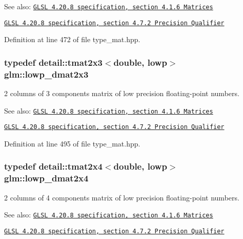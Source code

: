 \begin{Desc}
\item[See also:]\href{http://www.opengl.org/registry/doc/GLSLangSpec.4.20.8.pdf}{\tt GLSL 4.20.8 specification, section 4.1.6 Matrices} 

\href{http://www.opengl.org/registry/doc/GLSLangSpec.4.20.8.pdf}{\tt GLSL 4.20.8 specification, section 4.7.2 Precision Qualifier} \end{Desc}


Definition at line 472 of file type\_\-mat.hpp.\hypertarget{group__core__precision_g2c7432984a35cf72050870a54485ef35}{
\subsubsection[lowp\_\-dmat2x3]{\setlength{\rightskip}{0pt plus 5cm}typedef detail::tmat2x3$<$double, lowp$>$ {\bf glm::lowp\_\-dmat2x3}}}
\label{group__core__precision_g2c7432984a35cf72050870a54485ef35}


2 columns of 3 components matrix of low precision floating-point numbers.

\begin{Desc}
\item[See also:]\href{http://www.opengl.org/registry/doc/GLSLangSpec.4.20.8.pdf}{\tt GLSL 4.20.8 specification, section 4.1.6 Matrices} 

\href{http://www.opengl.org/registry/doc/GLSLangSpec.4.20.8.pdf}{\tt GLSL 4.20.8 specification, section 4.7.2 Precision Qualifier} \end{Desc}


Definition at line 495 of file type\_\-mat.hpp.\hypertarget{group__core__precision_gc2285cef559b0dc35cb9a7f22e6a2dd8}{
\subsubsection[lowp\_\-dmat2x4]{\setlength{\rightskip}{0pt plus 5cm}typedef detail::tmat2x4$<$double, lowp$>$ {\bf glm::lowp\_\-dmat2x4}}}
\label{group__core__precision_gc2285cef559b0dc35cb9a7f22e6a2dd8}


2 columns of 4 components matrix of low precision floating-point numbers.

\begin{Desc}
\item[See also:]\href{http://www.opengl.org/registry/doc/GLSLangSpec.4.20.8.pdf}{\tt GLSL 4.20.8 specification, section 4.1.6 Matrices} 

\href{http://www.opengl.org/registry/doc/GLSLangSpec.4.20.8.pdf}{\tt GLSL 4.20.8 specification, section 4.7.2 Precision Qualifier} \end{Desc}



